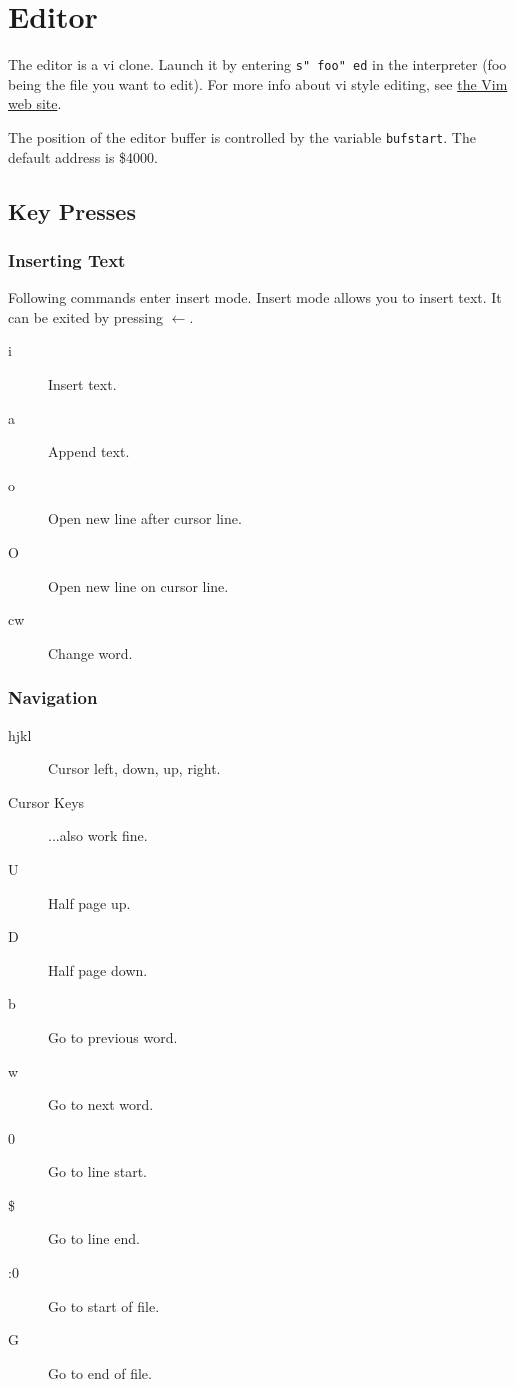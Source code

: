 \chapter{Editor} \label{editor}

The editor is a vi clone. Launch it by entering \texttt{s" foo" ed} in the interpreter (foo being the file you want to edit). For more info about vi style editing, see \href{http://www.vim.org}{the Vim web site}.

The position of the editor buffer is controlled by the variable \texttt{bufstart}. The default address is \$4000.

\section{Key Presses}

\subsection{Inserting Text}
Following commands enter insert mode. Insert mode allows you to insert text. It can be exited by pressing $\leftarrow$.
\begin{description}
\item[i] Insert text.
\item[a] Append text.
\item[o] Open new line after cursor line.
\item[O] Open new line on cursor line.
\item[cw] Change word.
\end{description}

\subsection{Navigation}
\begin{description}
\item[hjkl] Cursor left, down, up, right.
\item[Cursor Keys] ...also work fine.
\item[U] Half page up.
\item[D] Half page down.
\item[b] Go to previous word.
\item[w] Go to next word.
\item[0] Go to line start.
\item[\$] Go to line end.
\item[:0] Go to start of file.
\item[G] Go to end of file.
\end{description}

